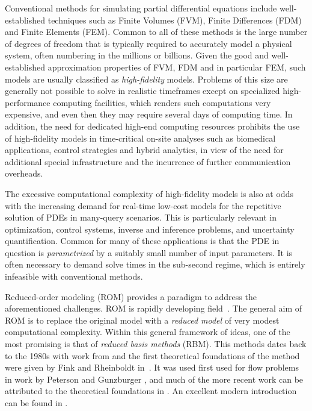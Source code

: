 \documentclass[onecolumn, twoside, a4paper, 11pt]{article}
\begin{document}
Conventional methods for simulating partial differential equations include
well-established techniques such as Finite Volumes (FVM),
Finite Differences (FDM) and Finite Elements (FEM).
Common to all of these methods is the large number of
degrees of freedom that is typically required to accurately model a physical system, often
numbering in the millions or billions. Given the good and well-established
approximation properties of FVM, FDM and in particular FEM, such models are
usually classified as \emph{high-fidelity} models. Problems of this size are
generally not possible to solve in realistic timeframes except on specialized
high-performance computing facilities, which renders such computations very expensive,
and even then they may require several days of computing time. In addition, the
need for dedicated high-end computing resources prohibits the use of high-fidelity
models in time-critical on-site analyses such as biomedical applications, control strategies
and hybrid analytics, in view of the need for additional special infrastructure and
the incurrence of further communication overheads.

The excessive computational complexity of high-fidelity models is also at odds
with the increasing demand for real-time low-cost models for the repetitive solution of PDEs
in many-query scenarios. This is particularly relevant in optimization, control systems,
inverse and inference problems, and uncertainty quantification. Common for many of these
applications is that the PDE in question is
\emph{parametrized} by a suitably small number of input parameters. It is often necessary
to demand solve times in the sub-second regime, which is entirely infeasible with conventional
methods.

Reduced-order modeling (ROM) provides a paradigm to address the aforementioned challenges.
ROM is rapidly developing field~\cite{Bazaz2012rpm}. The general aim of ROM is to replace
the original model with a \emph{reduced model} of very modest computational complexity. Within this
general framework of ideas, one of the most promising is that of \emph{reduced
basis methods} (RBM). This methods dates back to the 1980s with work from
\cite{Almroth1978acg,Almroth1981gfi,Nagy1979mrg,Noor1980rbt,Noor1981bpb,Noor1981rar,Noor1982mln}
and the first theoretical foundations of the method were given by Fink and
Rheinboldt in~\cite{Fink1983ebr,Fink1984sms}.
It was used first used for flow problems in work by Peterson and Gunzburger
\cite{Gunzburger2012fem,Peterson1989rbm}, and much of the more recent work can
be attributed to the theoretical foundations in
\cite{Prudhomme2002mcf,Veroy2003peb}.
An excellent modern introduction can be found in \cite{Quarteroni2016rbm}.
\end{document}
